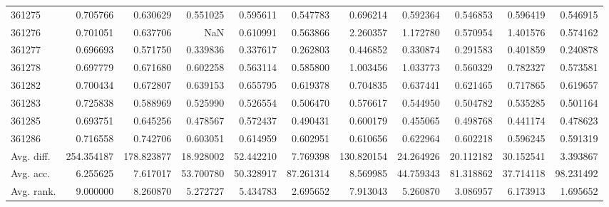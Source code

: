 \begin{tabular}{lrrrrrrrrrr}
361275 & 0.705766 & 0.630629 & 0.551025 & 0.595611 & 0.547783 & 0.696214 & 0.592364 & 0.546853 & 0.596419 & 0.546915 \\
361276 & 0.701051 & 0.637706 & NaN & 0.610991 & 0.563866 & 2.260357 & 1.172780 & 0.570954 & 1.401576 & 0.574162 \\
361277 & 0.696693 & 0.571750 & 0.339836 & 0.337617 & 0.262803 & 0.446852 & 0.330874 & 0.291583 & 0.401859 & 0.240878 \\
361278 & 0.697779 & 0.671680 & 0.602258 & 0.563114 & 0.585800 & 1.003456 & 1.033773 & 0.560329 & 0.782327 & 0.573581 \\
361282 & 0.700434 & 0.672807 & 0.639153 & 0.655795 & 0.619378 & 0.704835 & 0.637441 & 0.621465 & 0.717865 & 0.619657 \\
361283 & 0.725838 & 0.588969 & 0.525990 & 0.526554 & 0.506470 & 0.576617 & 0.544950 & 0.504782 & 0.535285 & 0.501164 \\
361285 & 0.693751 & 0.645256 & 0.478567 & 0.572437 & 0.490431 & 0.600179 & 0.455065 & 0.498768 & 0.441174 & 0.478623 \\
361286 & 0.716558 & 0.742706 & 0.603051 & 0.614959 & 0.602951 & 0.610656 & 0.622964 & 0.602218 & 0.596245 & 0.591319 \\
Avg. diff. & 254.354187 & 178.823877 & 18.928002 & 52.442210 & 7.769398 & 130.820154 & 24.264926 & 20.112182 & 30.152541 & 3.393867 \\
Avg. acc. & 6.255625 & 7.617017 & 53.700780 & 50.328917 & 87.261314 & 8.569985 & 44.759343 & 81.318862 & 37.714118 & 98.231492 \\
Avg. rank. & 9.000000 & 8.260870 & 5.272727 & 5.434783 & 2.695652 & 7.913043 & 5.260870 & 3.086957 & 6.173913 & 1.695652 \\
\bottomrule
\end{tabular}
